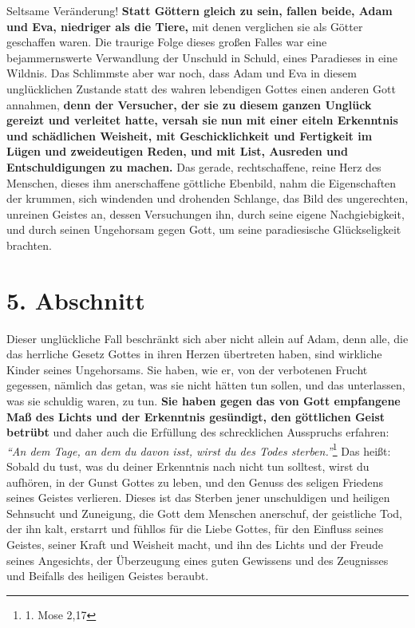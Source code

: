 Seltsame Veränderung! \textbf{Statt Göttern gleich zu sein, fallen beide, Adam
und Eva, 
niedriger als die Tiere,} mit denen verglichen sie als Götter geschaffen waren.
Die traurige Folge dieses großen Falles war eine bejammernswerte Verwandlung
der Unschuld in Schuld, eines Paradieses in eine Wildnis.
Das
Schlimmste aber
war noch, dass Adam und Eva in diesem unglücklichen Zustande statt des wahren
lebendigen Gottes einen anderen Gott annahmen, \textbf{denn der
Versucher, der sie zu
diesem ganzen Unglück gereizt und verleitet hatte, versah sie nun mit einer
eiteln Erkenntnis und schädlichen
Weisheit, mit Geschicklichkeit und
Fertigkeit
im Lügen und zweideutigen Reden, und mit
List, Ausreden und Entschuldigungen zu
machen.} Das gerade, rechtschaffene, reine Herz des Menschen, dieses ihm
anerschaffene göttliche Ebenbild, nahm die Eigenschaften der krummen, sich
windenden und drohenden Schlange, das Bild des
ungerechten, unreinen Geistes an,
dessen Versuchungen ihn, durch seine eigene Nachgiebigkeit, und durch seinen
Ungehorsam gegen Gott, um seine paradiesische
Glückseligkeit brachten.

\section{5. Abschnitt} \label{kap7_ab5}

Dieser unglückliche Fall beschränkt sich aber nicht allein auf Adam, denn alle,
die das herrliche Gesetz Gottes in ihren Herzen übertreten haben, sind wirkliche
Kinder seines Ungehorsams. Sie haben, wie er, von der verbotenen
Frucht
gegessen, nämlich das getan, was sie nicht hätten tun sollen, und das
unterlassen, was sie schuldig waren, zu tun. \textbf{Sie haben gegen das von
Gott
empfangene Maß des Lichts und der Erkenntnis gesündigt, den göttlichen Geist
betrübt} und daher auch die Erfüllung des schrecklichen Ausspruchs erfahren:
\textit{"`An dem Tage, an dem du davon isst, wirst du des Todes
sterben."'}\footnote{1. Mose 2,17}
Das heißt: Sobald du tust, was du deiner Erkenntnis nach nicht tun
solltest, wirst du aufhören, in der Gunst Gottes zu
leben, und den Genuss des
seligen Friedens seines Geistes verlieren. Dieses ist das
Sterben jener
unschuldigen und heiligen Sehnsucht und Zuneigung, die Gott dem Menschen
anerschuf, der geistliche Tod, der ihn kalt, erstarrt und
fühllos für die Liebe
Gottes, für den Einfluss seines Geistes, seiner Kraft und
Weisheit macht, und ihn
des Lichts und der Freude seines Angesichts, der Überzeugung eines guten
Gewissens und des Zeugnisses und Beifalls des heiligen Geistes beraubt.

